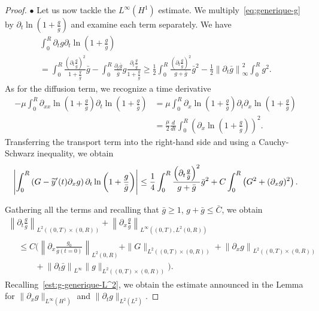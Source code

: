 \documentclass[AHL,Unicode,longabstracts,published]{cedram}
\newcommand{\p}{\partial}
\let\oldtilde\tilde
\renewcommand*{\tilde}[1]{\mathchoice{\widetilde{#1}}{\widetilde{#1}}{\oldtilde{#1}}{\oldtilde{#1}}}
\begin{document}
\begin{proof}
$\bullet$ Let us now tackle the $L^\infty(H^1)$ estimate. We multiply~\eqref{eq:generique-g} by $\p_t \ln (1+\frac{g}{\bar g})$ and examine each term separately. We have
\begin{multline*}
\int_0^R \p_t g \p_t \ln \left(1 + \frac{g}{\bar g}\right) \\
= \int_0^R \frac{\left(\p_t \frac{g}{\bar g}\right)^2 }{1 + \frac{g}{\bar g}}\bar g - \int_0^R \frac{\p_t \bar g}{\bar g} g \frac{\p_t \frac{g}{\bar g}}{1 + \frac{g}{\bar g}}\geq \frac{1}{2} \int_0^R\frac{\left(\p_t \frac{g}{\bar g}\right)^2 }{g+ \bar g}\bar g^2 -\frac{1}{2}\left\|\p_t \bar g\right\|_\infty^2 \int_0^R g^2.
\end{multline*}
As for the diffusion term, we recognize a time derivative
\begin{align*}
-\mu\int_0^R \p_{xx}\ln\left(1 + \frac{g}{\bar g}\right)\p_t \ln \left(1 + \frac{g}{\bar g}\right)
&=\mu \int_0^R \p_x\ln\left(1 + \frac{g}{\bar g}\right) \p_t\p_x \ln\left(1 + \frac{g}{\bar g}\right)\\
&=\frac{\mu}{2}\frac{d}{dt}\int_0^R \left(\p_x \ln\left(1 + \frac{g}{\bar g}\right)\right)^2.
\end{align*}
Transferring the transport term into the right-hand side and using a Cauchy-Schwarz inequality, we obtain
\begin{align*}
\left| \int_0^R \left(G-\tilde y'(t)\p_x g\right) \p_t \ln \left(1 + \frac{g}{\bar g}\right) \right|
\leq \frac{1}{4}\int_0^R\frac{\left(\p_t \frac{g}{\bar g}\right)^2 }{g+ \bar g}\bar g^2 + C \int_0^R \left(G^2 + (\p_x g)^2\right).
\end{align*}

Gathering all the terms and recalling that $\bar g \geq 1$, $g+\bar g \leq \bar C$, we obtain
\begin{multline*}
\left\| \p_t \frac{g}{\bar g}\right\|_{L^2((0,T)\times (0,R))} + \left\| \p_x \frac{g}{\bar g}\right\|_{L^\infty\left((0,T), L^2 (0,R)\right)}\\
\begin{aligned}
&\leq C \Big(\left\| \p_x \frac{g_0}{\bar g(t=0)}\right\|_{L^2 (0,R)} + \| G\|_{L^2\left((0,T)\times (0,R)\right)} + \left\| \p_x g\right\|_{L^2\left((0,T)\times (0,R)\right)} \\
&\qquad+ \left\|\p_t \bar g\right\|_{L^\infty} \|g\|_{L^2\left((0,T)\times (0,R)\right)}\Big).
\end{aligned}
\end{multline*}
Recalling~\eqref{est:g-generique-L^2}, we obtain the estimate announced in the Lemma for $\|\p_x g\|_{L^\infty(H^1)}$ and $\|\p_t g\|_{L^2(L^2)}$.


\end{proof}
\end{document}
